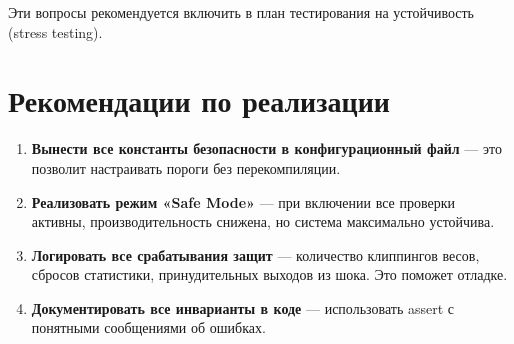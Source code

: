 Эти вопросы рекомендуется включить в план тестирования на устойчивость (stress testing).

\section{Рекомендации по реализации}

\begin{enumerate}
    \item \textbf{Вынести все константы безопасности в конфигурационный файл} — это позволит настраивать пороги без перекомпиляции.
    
    \item \textbf{Реализовать режим «Safe Mode»} — при включении все проверки активны, производительность снижена, но система максимально устойчива.
    
    \item \textbf{Логировать все срабатывания защит} — количество клиппингов весов, сбросов статистики, принудительных выходов из шока. Это поможет отладке.
    
    \item \textbf{Документировать все инварианты в коде} — использовать assert с понятными сообщениями об ошибках.
\end{enumerate}
